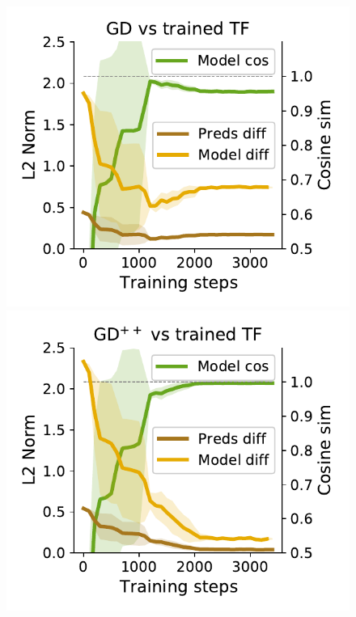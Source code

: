 \documentclass{article}
\theoremstyle{plain}
\theoremstyle{definition}
\theoremstyle{remark}
\begin{document}
\begin{figure}
\begin{center}
\begin{minipage}{.24\textwidth}
\begin{center}
    \includegraphics[width=1.\textwidth]{Final_figures/linear/two_layers_rec/sim.pdf}
  \end{center}
  \vspace{-10pt}
\end{minipage}
\begin{minipage}{.24\textwidth}
  \centering
  \begin{center}
    \includegraphics[width=1.\textwidth]{Final_figures/linear/two_layers_rec/sim_plus.pdf}

\end{center}
\end{minipage}
\end{center}
\end{figure}
\end{document}
